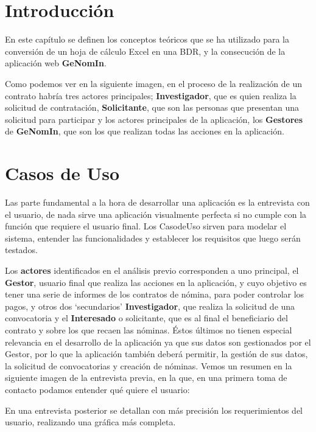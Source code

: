 \section{Introducción}
En este capítulo se definen los conceptos teóricos que se ha utilizado para la conversión de un hoja de cálculo Excel en una \acrfull{BDR}, y la consecución de la aplicación web \textbf{GeNomIn}.

Como podemos ver en la siguiente imagen, en el proceso de la realización de un contrato habría tres actores principales; \textbf{Investigador}, que es quien realiza la solicitud de contratación, \textbf{Solicitante}, que son las personas que presentan una solicitud para participar y los actores principales de la aplicación, los \textbf{Gestores} de \textbf{GeNomIn}, que son los que realizan todas las acciones en la aplicación.

\section{Casos de Uso}

Las parte fundamental a la hora de desarrollar una aplicación es la entrevista con el usuario, de nada sirve una aplicación visualmente perfecta si no cumple con la función que requiere el usuario final.
Los \gls{CasodeUso} sirven para modelar el sistema, entender las funcionalidades y establecer los requisitos que luego serán testados.

Los \textbf{actores} identificados en el análisis previo corresponden a uno principal, el \textbf{Gestor}, usuario final que realiza las acciones en la aplicación, y cuyo objetivo es tener una serie de informes de los contratos de nómina, para poder controlar los pagos, y otros dos `secundarios' \textbf{Investigador}, que realiza la solicitud de una convocatoria y el \textbf{Interesado} o solicitante, que es al final el beneficiario del contrato y sobre los que recaen las nóminas. Éstos últimos no tienen especial relevancia en el desarrollo de la aplicación ya que sus datos son gestionados por el Gestor, por lo que la aplicación también deberá permitir, la gestión de sus datos, la solicitud de convocatorias y creación de nóminas.
Vemos un resumen en la siguiente imagen de la entrevista previa, en la que, en una primera toma de contacto podamos entender qué quiere el usuario:

En una entrevista posterior se detallan con más precisión los requerimientos del usuario, realizando una gráfica más completa.

